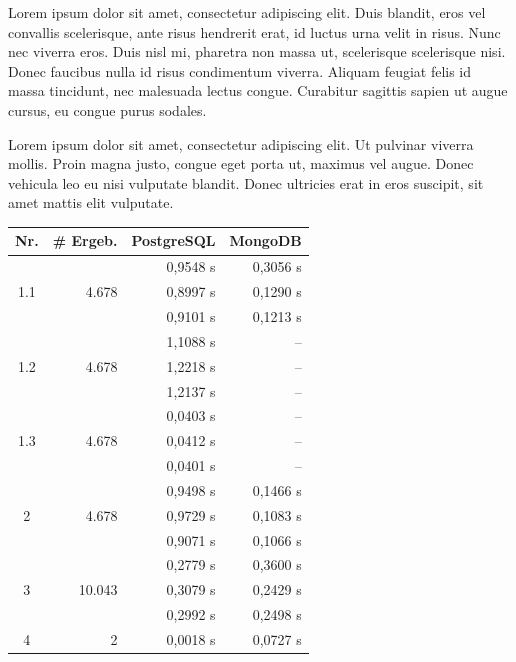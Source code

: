 Lorem ipsum dolor sit amet, consectetur adipiscing elit. Duis blandit, eros vel convallis scelerisque, ante risus hendrerit erat, id luctus urna velit in risus. Nunc nec viverra eros. Duis nisl mi, pharetra non massa ut, scelerisque scelerisque nisi. Donec faucibus nulla id risus condimentum viverra. Aliquam feugiat felis id massa tincidunt, nec malesuada lectus congue. Curabitur sagittis sapien ut augue cursus, eu congue purus sodales. 

Lorem ipsum dolor sit amet, consectetur adipiscing elit. Ut pulvinar viverra mollis. Proin magna justo, congue eget porta ut, maximus vel augue. Donec vehicula leo eu nisi vulputate blandit. Donec ultricies erat in eros suscipit, sit amet mattis elit vulputate. 

\begin{table}[hb]
\scriptsize
\begin{minipage}{0.49\linewidth}
\centering
\begin{tabular}{||c | r | r | r |} 
    \hline
    \textbf{Nr.} & \textbf{\# Ergeb.} & \textbf{PostgreSQL} & \textbf{MongoDB} \\ [0.5ex]
    \hline\hline
    \multirow{3}{*}{1.1} & \multirow{3}{*}{4.678} 
      & 0,9548 s & 0,3056 s \\
    & & 0,8997 s & 0,1290 s \\
    & & 0,9101 s & 0,1213 s \\
    \hline
    \multirow{3}{*}{1.2} & \multirow{3}{*}{4.678} 
      & 1,1088 s & -- \\
    & & 1,2218 s & -- \\
    & & 1,2137 s & -- \\
    \hline
    \multirow{3}{*}{1.3} & \multirow{3}{*}{4.678} 
      & 0,0403 s & -- \\
    & & 0,0412 s & -- \\
    & & 0,0401 s & -- \\
    \hline
    \multirow{3}{*}{2} & \multirow{3}{*}{4.678} 
      & 0,9498 s & 0,1466 s \\
    & & 0,9729 s & 0,1083 s \\
    & & 0,9071 s & 0,1066 s \\
    \hline
    \multirow{3}{*}{3} & \multirow{3}{*}{10.043} 
      & 0,2779 s & 0,3600 s \\
    & & 0,3079 s & 0,2429 s \\
    & & 0,2992 s & 0,2498 s \\
    \hline
    \multirow{3}{*}{4} & \multirow{3}{*}{2} 
      & 0,0018 s & 0,0727 s \\

\end{tabular}
\end{minipage}
\end{table}
